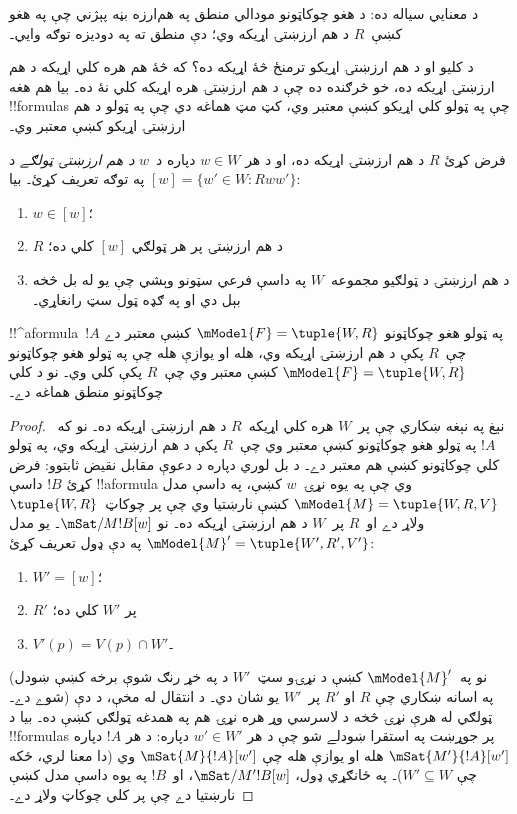 \documentclass[../../../include/open-logic-section]{subfiles}
\begin{document}
 د  معنايي
سياله ده: د هغو چوکاټونو مودالي منطق په هم‌ارزه بڼه پېژني چې
په هغو کښې~$R$ د هم ارزښتۍ اړيکه وي؛ دې منطق ته په دوديزه توګه
 وايي۔

د کليو او د هم ارزښتۍ اړيکو ترمنځ څۀ اړيکه ده؟ که څۀ هم هره
کلي اړيکه د هم ارزښتۍ اړيکه ده، خو څرګنده ده چې د هم ارزښتۍ
هره اړيکه کلي نۀ ده۔ بيا هم هغه !!{formula}s چې په ټولو
کلي اړيکو کښې معتبر وي، کټ مټ هماغه دي چې په ټولو د هم
ارزښتۍ اړيکو کښې معتبر وي۔

\begin{prop}
  فرض کړئ $R$ د هم ارزښتۍ اړيکه ده، او د هر $w \in W$ دپاره
  د~$w$ \emph{د هم ارزښتۍ ټولګے} د $[w] = \{w'\in W :
  Rww'\}$ په توګه تعريف کړئ۔ بيا:
  \begin{enumerate}
  \item $w \in [w]$؛
  \item $R$ د هم ارزښتۍ پر هر ټولګي $[w]$ کلي ده؛
  \item د هم ارزښتۍ د ټولګيو مجموعه~$W$ په داسې فرعي سټونو
    وېشي چې يو له بل څخه بېل دي او په ګډه ټول سټ رانغاړي۔
  \end{enumerate}
\end{prop}

\begin{prop}
  !!^a{formula}~$!A$ په ټولو هغو چوکاټونو
  $\mModel{F} =\tuple{W,R}$ کښې معتبر دے چې~$R$ پکې د هم
  ارزښتۍ اړيکه وي، هله او يوازې هله چې په ټولو هغو چوکاټونو
  $\mModel{F} =\tuple{W,R}$ کښې معتبر وي چې~$R$ پکې کلي
  وي۔ نو د کلي چوکاټونو منطق هماغه  دے۔
\end{prop}

\begin{proof}
  نېغ په نېغه ښکاري چې پر~$W$ هره کلي اړيکه~$R$ د هم
  ارزښتۍ اړيکه ده۔ نو که~$!A$ په ټولو هغو چوکاټونو کښې
  معتبر وي چې~$R$ پکې د هم ارزښتۍ اړيکه وي، په ټولو کلي
  چوکاټونو کښې هم معتبر دے۔ د بل لوري دپاره د دعوې مقابل
  نقيض ثابتوو: فرض کړئ $!B$ داسې !!a{formula} وي چې په
  يوه نړۍ~$w$ کښې، په داسې مدل
  $\mModel{M} = \tuple{W, R, V}$ کښې نارښتيا وي چې پر
  چوکاټ~$\tuple{W,R}$ ولاړ دے او~$R$ پر~$W$ د هم ارزښتۍ
  اړيکه ده۔ نو $\mSat/{M}{!B}[w]$۔ يو مدل
  $\mModel{M}' = \tuple{W',
    R', V'}$ په دې ډول تعريف کړئ:
  \begin{enumerate}
  \item $W' = [w]$؛
  \item $R'$ پر $W'$ کلي ده؛
  \item $V'(p) = V(p) \cap W'$۔
  \end{enumerate}
  (نو په~$\mModel{M}'$ کښې د نړۍو سټ~$W'$ د
   په خړ رنګ شوې برخه کښې ښودل شوے دے۔)
  په اسانه ښکاري چې $R$ او $R'$ پر~$W'$ يو شان دي۔ د انتقال
  له مخې، د دې ټولګي له هرې نړۍ څخه د لاسرسي وړ هره نړۍ هم
  په همدغه ټولګي کښې ده۔ بيا د !!{formula}s پر جوړښت په استقرا ښودلے شو چې د هر
  $w' \in W'$ دپاره: د هر $!A$ دپاره
  $\mSat{M'}{!A}[w']$ هله او يوازې هله چې
  $\mSat{M}{!A}[w']$ وي (دا معنا لري، ځکه چې $W'
  \subseteq W$)۔ په ځانګړي ډول، $\mSat/{M'}{!B}[w]$،
  او~$!B$ په يوه داسې مدل کښې نارښتيا دے چې پر کلي
  چوکاټ ولاړ دے۔
\end{proof}
\end{document}
